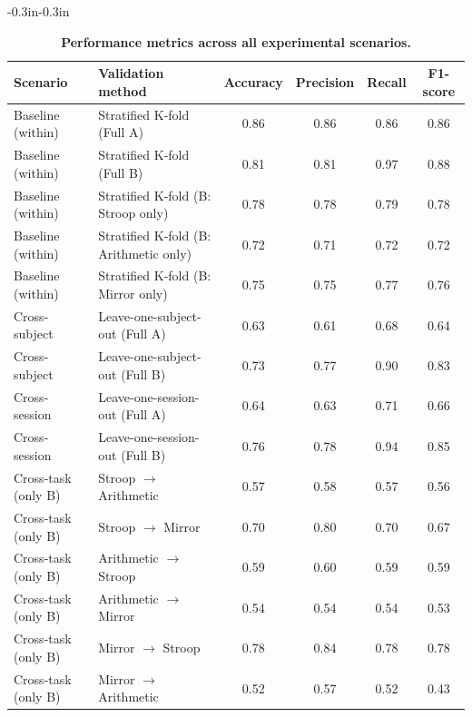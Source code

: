 \documentclass[10pt,letterpaper]{article}
\begin{document}
\begin{table}[!ht]
\centering
\caption{\textbf{Performance metrics across all experimental scenarios.}}
\label{tab:results}
\begin{adjustwidth}{-0.3in}{-0.3in}
\centering
\begin{tabular}{|l|l|c|c|c|c|}
\hline
\textbf{Scenario} & \textbf{Validation method} & \textbf{Accuracy} & \textbf{Precision} & \textbf{Recall} & \textbf{F1-score} \\ \hline
Baseline (within) & Stratified K-fold (Full A)             & 0.86 & 0.86 & 0.86 & 0.86 \\ \hline
Baseline (within) & Stratified K-fold (Full B)             & 0.81 & 0.81 & 0.97 & 0.88 \\ \hline
Baseline (within) & Stratified K-fold (B: Stroop only)     & 0.78 & 0.78 & 0.79 & 0.78 \\ \hline
Baseline (within) & Stratified K-fold (B: Arithmetic only) & 0.72 & 0.71 & 0.72 & 0.72 \\ \hline
Baseline (within) & Stratified K-fold (B: Mirror only)     & 0.75 & 0.75 & 0.77 & 0.76 \\ \hline
Cross-subject & Leave-one-subject-out (Full A)             & 0.63 & 0.61 & 0.68 & 0.64 \\ \hline
Cross-subject & Leave-one-subject-out (Full B)             & 0.73 & 0.77 & 0.90 & 0.83 \\ \hline
Cross-session & Leave-one-session-out (Full A)             & 0.64 & 0.63 & 0.71 & 0.66 \\ \hline
Cross-session & Leave-one-session-out (Full B)             & 0.76 & 0.78 & 0.94 & 0.85 \\ \hline
Cross-task (only B) & Stroop $\rightarrow$ Arithmetic      & 0.57 & 0.58 & 0.57 & 0.56 \\ \hline
Cross-task (only B) & Stroop $\rightarrow$ Mirror          & 0.70 & 0.80 & 0.70 & 0.67 \\ \hline
Cross-task (only B) & Arithmetic $\rightarrow$ Stroop      & 0.59 & 0.60 & 0.59 & 0.59 \\ \hline
Cross-task (only B) & Arithmetic $\rightarrow$ Mirror      & 0.54 & 0.54 & 0.54 & 0.53 \\ \hline
Cross-task (only B) & Mirror $\rightarrow$ Stroop          & 0.78 & 0.84 & 0.78 & 0.78 \\ \hline
Cross-task (only B) & Mirror $\rightarrow$ Arithmetic      & 0.52 & 0.57 & 0.52 & 0.43 \\ \hline

\end{tabular}
\end{adjustwidth}
\end{table}
\end{document}
